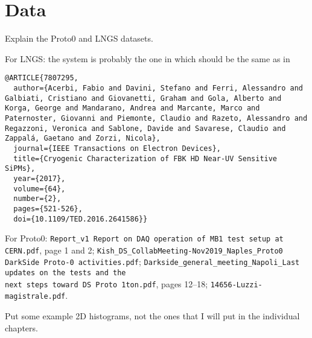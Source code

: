 \chapter{Data}
\label{ch:data}

Explain the Proto0 and LNGS datasets.

For LNGS: the system is probably the one in \cite{savarese2018} which should be
the same as in
%
\begin{verbatim}
@ARTICLE{7807295,
  author={Acerbi, Fabio and Davini, Stefano and Ferri, Alessandro and Galbiati, Cristiano and Giovanetti, Graham and Gola, Alberto and Korga, George and Mandarano, Andrea and Marcante, Marco and Paternoster, Giovanni and Piemonte, Claudio and Razeto, Alessandro and Regazzoni, Veronica and Sablone, Davide and Savarese, Claudio and Zappalá, Gaetano and Zorzi, Nicola},
  journal={IEEE Transactions on Electron Devices}, 
  title={Cryogenic Characterization of FBK HD Near-UV Sensitive SiPMs}, 
  year={2017},
  volume={64},
  number={2},
  pages={521-526},
  doi={10.1109/TED.2016.2641586}}
\end{verbatim}

For Proto0: \nolinkurl{Report_v1 Report on DAQ operation of MB1 test setup at
CERN.pdf}, page 1 and 2; \nolinkurl{Kish_DS_CollabMeeting-Nov2019_Naples_Proto0
DarkSide Proto-0 activities.pdf};
\nolinkurl{Darkside_general_meeting_Napoli_Last updates on the tests and the
next steps toward DS Proto 1ton.pdf}, pages 12--18;
\nolinkurl{14656-Luzzi-magistrale.pdf}.

Put some example 2D histograms, not the ones that I will put in the individual
chapters.
